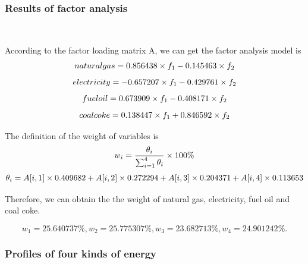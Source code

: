 \documentclass[a4paper,11pt]{article}
\begin{document}
\subsubsection{Results of factor analysis}
\textrm{\\}
\par According to the factor loading matrix A, we can get the factor analysis model is
\begin{equation}
    \centering
     natural gas=0.856438 \times f_1-0.145463 \times f_2
\end{equation}
\begin{equation}
    \centering
 electricity=-0.657207 \times f_1-0.429761 \times f_2
\end{equation}
\begin{equation}
    \centering
 fuel oil=0.673909 \times f_1-0.408171 \times f_2
\end{equation}
\begin{equation}
    \centering
coal coke=0.138447 \times f_1+0.846592 \times f_2
\end{equation}
\par The definition of the weight of variables is\cite{5}
\begin{equation}
    \centering
w_i=\frac{ \theta_i }{ \sum_{i=1}^{4}\theta_i } \times 100\%
\end{equation}
\begin{equation}
    \centering
\theta_i=A[i,1] \times 0.409682+A[i,2] \times 0.272294+A[i,3] \times 0.204371+A[i,4] \times 0.113653
\end{equation}

\par Therefore, we can obtain the the weight of natural gas, electricity, fuel oil and coal coke.

\[
w_1=25.640737\%, w_2=25.775307\%, w_3=23.682713\%, w_4=24.901242\%.
\]

\subsubsection{Profiles of four kinds of energy}
\end{document}
